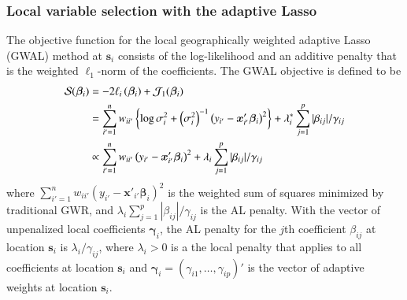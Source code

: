 \documentclass[authoryear, review, 11pt]{elsarticle}
\begin{document}
	\subsubsection{Local variable selection with the adaptive Lasso}
	The objective function for the local geographically weighted adaptive Lasso (GWAL) method at $\bm{s}_i$ consists of the log-likelihood and an additive penalty that is the weighted $\ell_1$-norm of the coefficients. The GWAL objective is defined to be
	\begin{align}\label{eq:adaptive-lasso-WLS}
		\mathcal{S}(\bm{\beta}_i) &= -2\ell_i\left(\bm{\beta}_i\right) + \mathcal{J}_1(\bm{\beta}_i) \notag \\
		&= \sum_{i'=1}^n w_{ii'}  \left\{ \log{\sigma^2_i}  + \left(\sigma^2_i\right)^{-1}  \left(y_{i'} - \bm{x}'_{i'} \bm{\beta}_i \right)^2 \right\} +  \lambda^*_i \sum_{j=1}^p |\beta_{ij}| / \gamma_{ij} \notag \\
		&\propto \sum_{i'=1}^n w_{ii'} \left(y_{i'} - \bm{x}'_{i'} \bm{\beta}_i \right)^2 +  \lambda_i \sum_{j=1}^p |\beta_{ij}| / \gamma_{ij}
	\end{align}
	where $\sum_{i'=1}^n w_{ii'} \left(y_{i'} - \bm{x}'_{i'} \bm{\beta}_i \right)^2$ is the weighted sum of squares minimized by traditional GWR, and $\lambda_i \sum_{j=1}^p |\beta_{ij}| / \gamma_{ij}$ is the AL penalty. With the vector of unpenalized local coefficients $\bm{\gamma}_i$, the AL penalty for the $j$th coefficient $\beta_{ij}$ at location $\bm{s}_i$ is $\lambda_i / \gamma_{ij}$, where $\lambda_i > 0$ is a the local penalty that applies to all coefficients at location $\bm{s}_i$ and $\bm{\gamma}_i = \left(\gamma_{i1}, \dots, \gamma_{ip}\right)'$ is the vector of adaptive weights at location $\bm{s}_i$.
	
\end{document}
